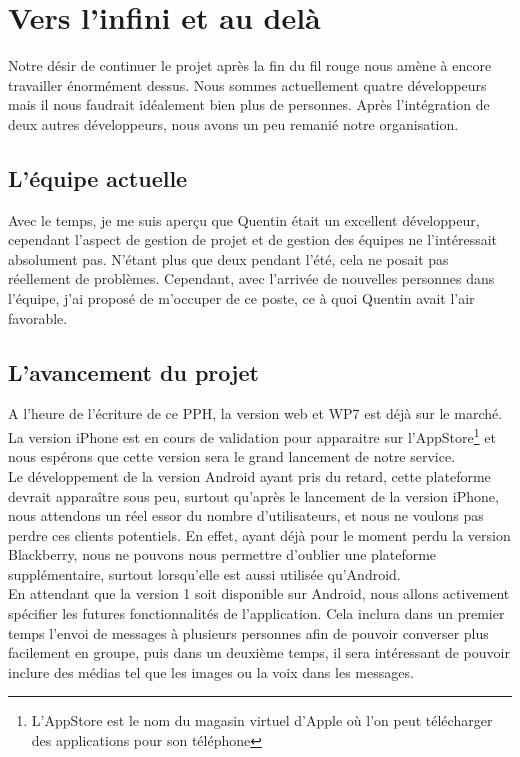 \documentclass{article}
\begin{document}
\section{Vers l'infini et au delà}

	Notre désir de continuer le projet après la fin du fil rouge nous amène à encore travailler énormément dessus. Nous sommes actuellement quatre développeurs mais il nous faudrait idéalement bien plus de personnes. Après l'intégration de deux autres développeurs, nous avons un peu remanié notre organisation.

	\subsection{L'équipe actuelle}
	Avec le temps, je me suis aperçu que Quentin était un excellent développeur, cependant l'aspect de gestion de projet et de gestion des équipes ne l'intéressait absolument pas. N'étant plus que deux pendant l'été, cela ne posait pas réellement de problèmes. Cependant, avec l'arrivée de nouvelles personnes dans l'équipe, j'ai proposé de m'occuper de ce poste, ce à quoi Quentin avait l'air favorable. 
	\subsection{L'avancement du projet}
	A l'heure de l'écriture de ce PPH, la version web et WP7 est déjà sur le marché. La version iPhone est en cours de validation pour apparaitre sur l'AppStore\footnote{L'AppStore est le nom du magasin virtuel d'Apple où l'on peut télécharger des applications pour son téléphone} et nous espérons que cette version sera le grand lancement de notre service. \\
	
	Le développement de la version Android ayant pris du retard, cette plateforme devrait apparaître sous peu, surtout qu'après le lancement de la version iPhone, nous attendons un réel essor du nombre d'utilisateurs, et nous ne voulons pas perdre ces clients potentiels. En effet, ayant déjà pour le moment perdu la version Blackberry, nous ne pouvons nous permettre d'oublier une plateforme supplémentaire, surtout lorsqu'elle est aussi utilisée qu'Android. \\
	
	En attendant que la version 1 soit disponible sur Android, nous allons activement spécifier les futures fonctionnalités de l'application. Cela inclura dans un premier temps l'envoi de messages à plusieurs personnes afin de pouvoir converser plus facilement en groupe, puis dans un deuxième temps, il sera intéressant de pouvoir inclure des médias tel que les images ou la voix dans les messages.  
	
\end{document}
